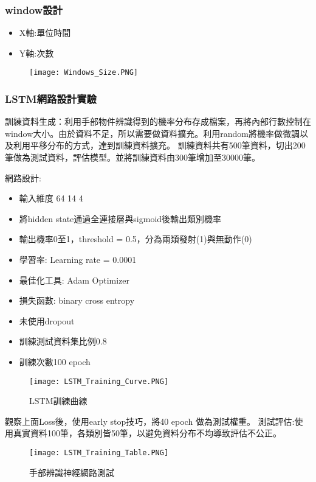 \subsubsection{window設計}

\begin{itemize}
\item X軸:單位時間
\item Y軸:次數
\end{itemize}

\begin{figure}[H]
    \centering
    \texttt{[image: Windows\_Size.PNG]}
    \caption{}
\end{figure}

\subsubsection{LSTM網路設計實驗}

訓練資料生成：利用手部物件辨識得到的機率分布存成檔案，再將內部行數控制在window大小。由於資料不足，所以需要做資料擴充。利用random將機率做微調以及利用平移分布的方式，達到訓練資料擴充。
訓練資料共有500筆資料，切出200筆做為測試資料，評估模型。並將訓練資料由300筆增加至30000筆。

網路設計:
\begin{itemize}
\item 輸入維度  64 14 4
\item 將hidden state通過全連接層與sigmoid後輸出類別機率
\item 輸出機率0至1，threshold = 0.5，分為兩類發射(1)與無動作(0)
\item 學習率: Learning rate = 0.0001
\item 最佳化工具: Adam Optimizer
\item 損失函數: binary cross entropy
\item 未使用dropout
\item 訓練測試資料集比例0.8
\item 訓練次數100 epoch
\end{itemize}

\begin{figure}[H]
    \centering
    \texttt{[image: LSTM\_Training\_Curve.PNG]}
    \caption{LSTM訓練曲線}
    \label{fig:LSTM訓練曲線}
\end{figure}

觀察上面Loss後，使用early stop技巧，將40 epoch 做為測試權重。
測試評估:使用真實資料100筆，各類別皆50筆，以避免資料分布不均導致評估不公正。

\begin{figure}[H]
    \centering
    \texttt{[image: LSTM\_Training\_Table.PNG]}
    \caption{手部辨識神經網路測試}
    \label{fig:手部辨識神經網路測試}
\end{figure}

